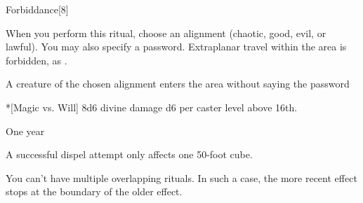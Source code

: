 \begin{spellsection}{Forbiddance}[8]
    \begin{spellheader}
    \end{spellheader}
    \begin{spellcontent}
        \begin{spelltargetinginfo}
        \end{spelltargetinginfo}
        \begin{spelleffects}

            \spellspecial When you perform this ritual, choose an alignment (chaotic, good, evil, or lawful). You may also specify a password.
            \spellline
            \spelleffect Extraplanar travel within the area is forbidden, as .
            \begin{spelltrigger}{A creature of the chosen alignment enters the area without saying the password}
                \begin{spelltarget}*[Magic vs. Will]
                    \spellsuccess 8d6 divine damage \add d6 per caster level above 16th.
                \end{spelltarget}
            \end{spelltrigger}
            \spelldur One year
        \end{spelleffects}
    \end{spellcontent}
    \begin{spellfooter}
        \spellnotes A successful dispel attempt only affects one 50-foot cube.
        \par You can't have multiple overlapping  rituals. In such a case, the more recent effect stops at the boundary of the older effect.
    \end{spellfooter}
\end{spellsection}

